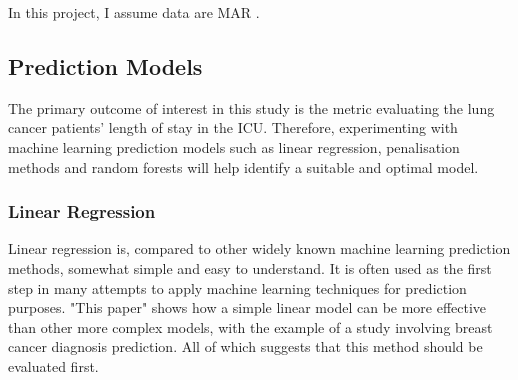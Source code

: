 \documentclass[11pt]{article}
\begin{document}

In this project, I assume data are MAR .%




\subsection{Prediction Models}
The primary outcome of interest in this study is the metric evaluating the lung cancer patients' length of stay in the ICU. Therefore, experimenting with machine learning prediction models such as linear regression, penalisation methods and random forests will help identify a suitable and optimal model.

\subsubsection{Linear Regression}
Linear regression is, compared to other widely known machine learning prediction methods, somewhat simple and easy to understand. It is often used as the first step in many attempts to apply machine learning techniques for prediction purposes. "This paper" shows how a simple linear model can be more effective than other more complex models, with the example of a study involving breast cancer diagnosis prediction\cite{Arshad2023}. All of which suggests that this method should be evaluated first.
\end{document}
